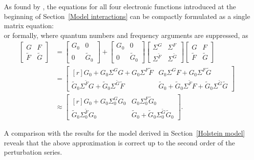 As found by  \cite{Nambu60}, the  equations for all four
electronic  functions introduced at the beginning of
Section~\ref{Model interactions} can be compactly formulated as a single matrix equation:
%
\begin{equation*}
    
\end{equation*}
%
or formally, where quantum numbers and frequency arguments are suppressed, as
%
\begin{align*}
	\begin{bmatrix}
		G & F \\
		\widetilde F & \widetilde G
	\end{bmatrix}
	&=
	\begin{bmatrix}
		G_0 & 0 \\
		0 & \widetilde G_0
	\end{bmatrix}
	+
	\begin{bmatrix}
		G_0 & 0 \\
		0 & \widetilde G_0
	\end{bmatrix}
	\begin{bmatrix}
		\Sigma^G & \Sigma^F \\
		\Sigma^{\widetilde F} & \Sigma^{\widetilde G}
	\end{bmatrix}
	\begin{bmatrix}
		G & F \\
		\widetilde F & \widetilde G
	\end{bmatrix}
	\\
	&=
	\begin{bmatrix*}[r]
		G_0 + G_0 \Sigma^G G + G_0 \Sigma^F \widetilde F
        & G_0 \Sigma^G F + G_0 \Sigma^F \widetilde G \\
		\widetilde G_0 \Sigma^{\widetilde F} G
        + \widetilde G_0 \Sigma^{\widetilde G} \widetilde F
        & \widetilde G_0 + \widetilde G_0 \Sigma^{\widetilde F} F
        + \widetilde G_0 \Sigma^{\widetilde G} \widetilde G
	\end{bmatrix*}
	\\
	&\approx
	\begin{bmatrix*}[r]
		G_0 + G_0 \Sigma^G_0 G_0 & G_0 \Sigma^F_0 \widetilde G_0 \\
		\widetilde G_0 \Sigma^{\widetilde F}_0 G_0 & \widetilde G_0
        + \widetilde G_0 \Sigma^{\widetilde G}_0 \widetilde G_0
	\end{bmatrix*}.
\end{align*}

A comparison with the results for the  model derived in
Section~\ref{Holstein model} reveals that the above approximation is correct up
to the second order of the perturbation series.

